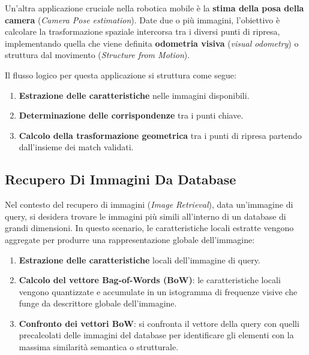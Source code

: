 ﻿\documentclass[11pt, a4paper]{article}
\begin{document}
Un'altra applicazione cruciale nella robotica mobile è la \textbf{stima della posa della camera} (\emph{Camera Pose estimation}). Date due o più immagini, l'obiettivo è calcolare la trasformazione spaziale intercorsa tra i diversi punti di ripresa, implementando quella che viene definita \textbf{odometria visiva} (\emph{visual odometry}) o struttura dal movimento (\emph{Structure from Motion}).

Il flusso logico per questa applicazione si struttura come segue:
\begin{enumerate}[noitemsep]
    \item \textbf{Estrazione delle caratteristiche} nelle immagini disponibili.
    \item \textbf{Determinazione delle corrispondenze} tra i punti chiave.
    \item \textbf{Calcolo della trasformazione geometrica} tra i punti di ripresa partendo dall'insieme dei match validati.
\end{enumerate}


\subsection{Recupero Di Immagini Da Database}

Nel contesto del recupero di immagini (\emph{Image Retrieval}), data un'immagine di query, si desidera trovare le immagini più simili all'interno di un database di grandi dimensioni. In questo scenario, le caratteristiche locali estratte vengono aggregate per produrre una rappresentazione globale dell'immagine:
\begin{enumerate}[noitemsep]
    \item \textbf{Estrazione delle caratteristiche} locali dell'immagine di query.
    \item \textbf{Calcolo del vettore Bag-of-Words (BoW)}: le caratteristiche locali vengono quantizzate e accumulate in un istogramma di frequenze visive che funge da descrittore globale dell'immagine.
    \item \textbf{Confronto dei vettori BoW}: si confronta il vettore della query con quelli precalcolati delle immagini del database per identificare gli elementi con la massima similarità semantica o strutturale.
\end{enumerate}
\end{document}
